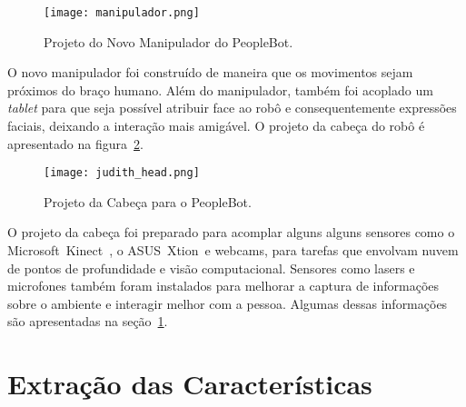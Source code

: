 \begin{figure}[ht!]
	\centering
	\begin{minipage}{0.6\textwidth}
		\caption{Projeto do Novo Manipulador do PeopleBot.}
		\texttt{[image: manipulador.png]}
		\label{fig:manipulador}
	\end{minipage}
\end{figure}

O novo manipulador foi construído de maneira que os movimentos sejam próximos do braço humano. Além do manipulador, também foi acoplado um \emph{tablet} para que seja possível atribuir face ao robô e consequentemente expressões faciais, deixando a interação mais amigável. O projeto da cabeça do robô é apresentado na figura~\ref{fig:judithhead}.

\begin{figure}[ht!]
	\centering
	\begin{minipage}{0.4\textwidth}
		\caption{Projeto da Cabeça para o PeopleBot.}
		\texttt{[image: judith\_head.png]}
		\label{fig:judithhead}
	\end{minipage}
\end{figure}

O projeto da cabeça foi preparado para acomplar alguns alguns sensores como o Microsoft\textregistered\ Kinect\textregistered\ , o ASUS\textregistered\ Xtion\textregistered\ e webcams, para tarefas que envolvam nuvem de pontos de profundidade e visão computacional. Sensores como lasers e microfones também foram instalados para melhorar a captura de informações sobre o ambiente e interagir melhor com a pessoa. Algumas dessas informações são apresentadas na seção~\ref{sec:extracaocaracteristicas}.

\section{Extração das Características}
\label{sec:extracaocaracteristicas}

